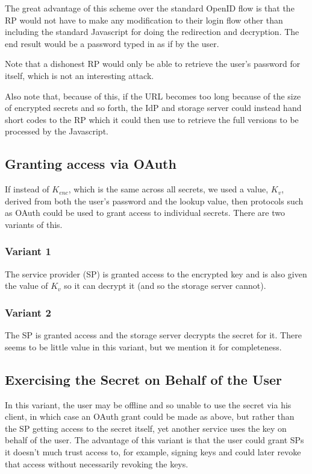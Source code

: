 \documentclass[a4paper,titlepage]{article}
\begin{document}
The great advantage of this scheme over the standard OpenID flow is
that the RP would not have to make any modification to their login
flow other than including the standard Javascript for doing the
redirection and decryption. The end result would be a password typed
in as if by the user.

Note that a dishonest RP would only be able to retrieve the user's
password for itself, which is not an interesting attack.

Also note that, because of this, if the URL becomes too long because
of the size of encrypted secrets and so forth, the IdP and storage
server could instead hand short codes to the RP which it could then
use to retrieve the full versions to be processed by the Javascript.

\subsection{Granting access via OAuth}

If instead of $K_{enc}$, which is the same across all secrets, we used
a value, $K_v$, derived from both the user's password and the lookup
value, then protocols such as OAuth could be used to grant access to
individual secrets. There are two variants of this.

\subsubsection{Variant 1}

The service provider (SP) is granted access to the encrypted key and
is also given the value of $K_v$ so it can decrypt it (and so the
storage server cannot).

\subsubsection{Variant 2}


The SP is granted access and the storage server decrypts the secret for it. There seems to be little value in this variant, but we mention it for completeness.

\subsection{Exercising the Secret on Behalf of the User}

In this variant, the user may be offline and so unable to use the
secret via his client, in which case an OAuth grant could be made as
above, but rather than the SP getting access to the secret itself, yet
another service uses the key on behalf of the user. The advantage of
this variant is that the user could grant SPs it doesn't much trust
access to, for example, signing keys and could later revoke that
access without necessarily revoking the keys.
\end{document}
